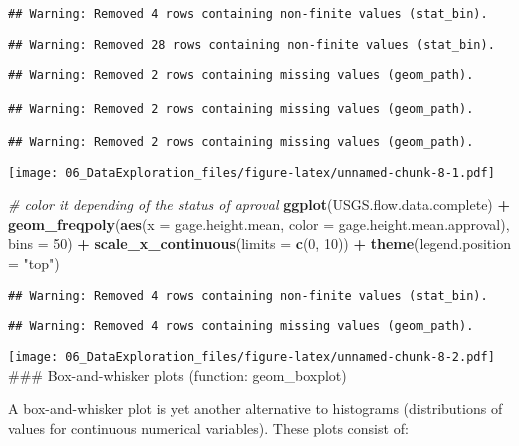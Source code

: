 \documentclass[]{article}
\newenvironment{Shaded}{\begin{snugshade}}{\end{snugshade}}
\newcommand{\KeywordTok}[1]{\textcolor[rgb]{0.13,0.29,0.53}{\textbf{#1}}}
\newcommand{\DataTypeTok}[1]{\textcolor[rgb]{0.13,0.29,0.53}{#1}}
\newcommand{\DecValTok}[1]{\textcolor[rgb]{0.00,0.00,0.81}{#1}}
\newcommand{\StringTok}[1]{\textcolor[rgb]{0.31,0.60,0.02}{#1}}
\newcommand{\CommentTok}[1]{\textcolor[rgb]{0.56,0.35,0.01}{\textit{#1}}}
\newcommand{\OperatorTok}[1]{\textcolor[rgb]{0.81,0.36,0.00}{\textbf{#1}}}
\newcommand{\NormalTok}[1]{#1}
\begin{document}
\begin{verbatim}
## Warning: Removed 4 rows containing non-finite values (stat_bin).
\end{verbatim}

\begin{verbatim}
## Warning: Removed 28 rows containing non-finite values (stat_bin).
\end{verbatim}

\begin{verbatim}
## Warning: Removed 2 rows containing missing values (geom_path).

## Warning: Removed 2 rows containing missing values (geom_path).

## Warning: Removed 2 rows containing missing values (geom_path).
\end{verbatim}

\texttt{[image: 06\_DataExploration\_files/figure-latex/unnamed-chunk-8-1.pdf]}

\begin{Shaded}
\begin{Highlighting}[]
\CommentTok{# color it depending of the status of aproval}
\KeywordTok{ggplot}\NormalTok{(USGS.flow.data.complete) }\OperatorTok{+}
\StringTok{  }\KeywordTok{geom_freqpoly}\NormalTok{(}\KeywordTok{aes}\NormalTok{(}\DataTypeTok{x =}\NormalTok{ gage.height.mean, }\DataTypeTok{color =}\NormalTok{ gage.height.mean.approval), }\DataTypeTok{bins =} \DecValTok{50}\NormalTok{) }\OperatorTok{+}
\StringTok{  }\KeywordTok{scale_x_continuous}\NormalTok{(}\DataTypeTok{limits =} \KeywordTok{c}\NormalTok{(}\DecValTok{0}\NormalTok{, }\DecValTok{10}\NormalTok{)) }\OperatorTok{+}
\StringTok{  }\KeywordTok{theme}\NormalTok{(}\DataTypeTok{legend.position =} \StringTok{"top"}\NormalTok{)}
\end{Highlighting}
\end{Shaded}

\begin{verbatim}
## Warning: Removed 4 rows containing non-finite values (stat_bin).
\end{verbatim}

\begin{verbatim}
## Warning: Removed 4 rows containing missing values (geom_path).
\end{verbatim}

\texttt{[image: 06\_DataExploration\_files/figure-latex/unnamed-chunk-8-2.pdf]}
\#\#\# Box-and-whisker plots (function: geom\_boxplot)

A box-and-whisker plot is yet another alternative to histograms
(distributions of values for continuous numerical variables). These
plots consist of:
\end{document}
